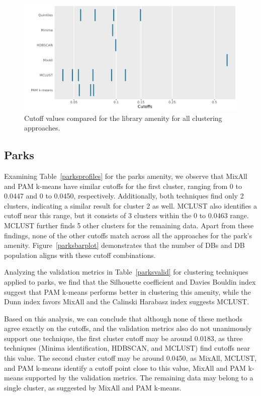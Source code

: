 \documentclass[11pt, a4paper]{article}
\begin{document}
\begin{figure}[H]
\centering
\includegraphics[width=\textwidth]{./cutoff_ticks/Library_ticks.png}
\caption[Library cutoff comparison]{Cutoff values compared for the library amenity for all clustering approaches.}\label{libraryticks}
\end{figure}










\pagebreak
\justifying
\subsection{Parks}

Examining Table~\ref{parksprofiles} for the parks amenity, we observe that MixAll and PAM k-means have similar cutoffs for the first cluster, ranging from 0 to 0.0447 and 0 to 0.0450, respectively. Additionally, both techniques find only 2 clusters, indicating a similar result for cluster 2 as well. MCLUST also identifies a cutoff near this range, but it consists of 3 clusters within the 0 to 0.0463 range. MCLUST further finds 5 other clusters for the remaining data. Apart from these findings, none of the other cutoffs match across all the approaches for the park's amenity. Figure~\ref{parksbarplot} demonstrates that the number of DBs and DB population aligns with these cutoff combinations.
\par
Analyzing the validation metrics in Table~\ref{parksvalid} for clustering techniques applied to parks, we find that the Silhouette coefficient and Davies Bouldin index suggest that PAM k-means performs better in clustering this amenity, while the Dunn index favors MixAll and the Calinski Harabasz index suggests MCLUST.
\par
Based on this analysis, we can conclude that although none of these methods agree exactly on the cutoffs, and the validation metrics also do not unanimously support one technique, the first cluster cutoff may be around 0.0183, as three techniques (Minima identification, HDBSCAN, and MCLUST) find cutoffs near this value. The second cluster cutoff may be around 0.0450, as MixAll, MCLUST, and PAM k-means identify a cutoff point close to this value, MixAll and PAM k-means supported by the validation metrics. The remaining data may belong to a single cluster, as suggested by MixAll and PAM k-means.
\end{document}
